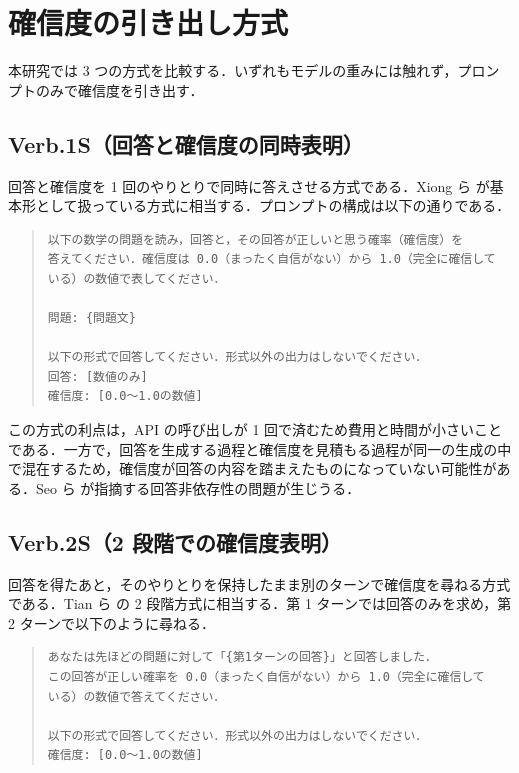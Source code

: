 \section{確信度の引き出し方式}

本研究では 3 つの方式を比較する．いずれもモデルの重みには触れず，プロンプトのみで確信度を引き出す．

\subsection{Verb.1S（回答と確信度の同時表明）}

回答と確信度を 1 回のやりとりで同時に答えさせる方式である．Xiong ら \cite{xiong2024llmuncertainty} が基本形として扱っている方式に相当する．プロンプトの構成は以下の通りである．

\begin{quote}
\begin{verbatim}
以下の数学の問題を読み，回答と，その回答が正しいと思う確率（確信度）を
答えてください．確信度は 0.0（まったく自信がない）から 1.0（完全に確信して
いる）の数値で表してください．

問題: {問題文}

以下の形式で回答してください．形式以外の出力はしないでください．
回答: [数値のみ]
確信度: [0.0〜1.0の数値]
\end{verbatim}
\end{quote}

この方式の利点は，API の呼び出しが 1 回で済むため費用と時間が小さいことである．一方で，回答を生成する過程と確信度を見積もる過程が同一の生成の中で混在するため，確信度が回答の内容を踏まえたものになっていない可能性がある．Seo ら \cite{seo2025advice} が指摘する回答非依存性の問題が生じうる．

\subsection{Verb.2S（2 段階での確信度表明）}

回答を得たあと，そのやりとりを保持したまま別のターンで確信度を尋ねる方式である．Tian ら \cite{tian2023justask} の 2 段階方式に相当する．第 1 ターンでは回答のみを求め，第 2 ターンで以下のように尋ねる．

\begin{quote}
\begin{verbatim}
あなたは先ほどの問題に対して「{第1ターンの回答}」と回答しました．
この回答が正しい確率を 0.0（まったく自信がない）から 1.0（完全に確信して
いる）の数値で答えてください．

以下の形式で回答してください．形式以外の出力はしないでください．
確信度: [0.0〜1.0の数値]
\end{verbatim}
\end{quote}

